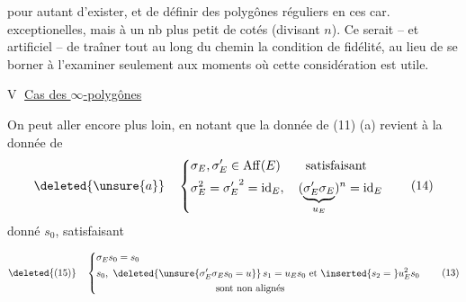 pour autant d'exister, et de définir des polygônes réguliers en ces car. exceptionelles, mais à un nb plus petit de cotés (divisant $n$). Ce serait  -- et  artificiel -- de traîner tout au long du chemin la condition de fidélité, au lieu de se borner à l'examiner seulement aux moments  où cette considération est utile.

\textcircled{V}  \uline{Cas des $\infty$-polygônes}

On peut aller encore plus loin, en notant que la donnée de (11) (a) revient à la donnée de
\[
\deleted{\unsure{a}}\quad
\left\{\begin{aligned}
&\sigma_E,\sigma'_E\in\mathrm{Aff}(E)\qquad\text{satisfaisant}\\
&\sigma_E^2={\sigma'_E}^2=\mathrm{id}_E,\quad
(\underbrace{\sigma'_E\sigma_E}_{u_E})^n=\mathrm{id}_E
\end{aligned}\right.\tag*{(14)}
\]
     donné $s_0$,  satisfaisant

\[
\deleted{(15)}\quad
\left\{\begin{aligned}
&\sigma_E s_0=s_0\\
&s_0,\ \deleted{\unsure{\sigma'_E\sigma_E s_0=u}}\,s_1=u_E s_0\text{ et }\inserted{s_2={}}u_E^2s_0\\
&\hspace{43mm}\text{sont non alignés}
\end{aligned}\right.\tag*{(13)}
\]
